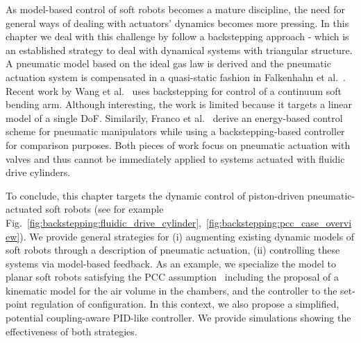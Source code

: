 As model-based control of soft robots becomes a mature discipline, the need for general ways of dealing with actuators' dynamics becomes more pressing. In this chapter we deal with this challenge by follow a backstepping approach - which is an established strategy to deal with dynamical systems with triangular structure. %
%
A pneumatic model based on the ideal gas law is derived and the pneumatic actuation system is compensated in a quasi-static fashion in Falkenhahn et al.~\cite{falkenhahn2016dynamic}.
%
%
%
Recent work by Wang et al.~\cite{wang2019parameter} uses backstepping for control of a continuum soft bending arm. Although interesting, the work is limited because it targets a linear model of a single DoF.
Similarily, Franco et al.~\cite{franco2021nonlinear} derive an energy-based control scheme for pneumatic manipulators while using a backstepping-based controller for comparison purposes.
% 
Both pieces of work focus on pneumatic actuation with valves and thus cannot be immediately applied to systems actuated with fluidic drive cylinders.

To conclude, this chapter targets the dynamic control of piston-driven pneumatic-actuated soft robots (see for example Fig.~\ref{fig:backstepping:fluidic_drive_cylinder},~\ref{fig:backstepping:pcc_case_overview}). 
We provide general strategies for (i) augmenting existing dynamic models of soft robots through a description of pneumatic actuation, (ii) controlling these systems via model-based feedback. 
As an example, we specialize the model to planar soft robots satisfying the \gls{PCC} assumption~\cite{della2020model} including the proposal of a kinematic model for the air volume in the chambers, and the controller to the set-point regulation of configuration. In this context, we also propose a simplified, potential coupling-aware PID-like controller. We provide simulations showing the effectiveness of both strategies.

